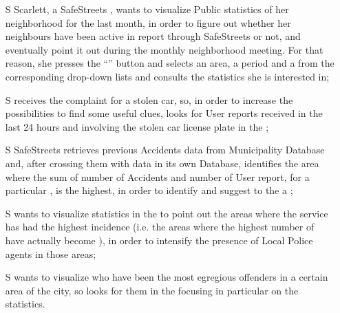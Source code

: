 \documentclass[../../../rasd.tex]{subfiles}
\begin{document}
\begin{itemize}
	\item[S\subs{5}]Scarlett, a SafeStreets , wants to visualize Public statistics of her neighborhood for the last month, in order to figure out whether her neighbours have been active in report  through SafeStreets or not, and eventually point it out during the monthly neighborhood meeting. For that reason, she presses the “” button and selects an area, a period and a  from the corresponding drop-down lists and consults the statistics she is interested in;
	
	\item[S\subs{6}] receives the complaint for a stolen car, so, in order to increase the possibilities to find some useful clues, looks for User reports received in the last 24 hours and involving the stolen car license plate in the ;
	
	\item[S\subs{7}]SafeStreets retrieves previous Accidents data from Municipality Database and, after crossing them with  data in its own Database, identifies the area where the sum of number of Accidents and number of User report, for a particular , is the highest, in order to identify and suggest to the  a ;
	
	\item[S\subs{8}] wants to visualize  statistics in the  to point out the areas where the service has had the highest incidence (i.e. the areas where the highest number of  have actually become ), in order to intensify the presence of Local Police agents in those areas;
	
	\item[S\subs{9}] wants to visualize who have been the most egregious offenders in a certain area of the city, so looks for them in the  focusing in particular on the  statistics.
	
\end{itemize}
\end{document}
